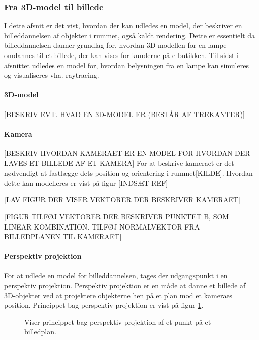 \subsubsection{Fra 3D-model til billede}
I dette afsnit er det vist, hvordan der kan udledes en model, der beskriver en billeddannelsen af objekter i rummet, også kaldt rendering. Dette er essentielt da billeddannelsen danner grundlag for, hvordan 3D-modellen for en lampe omdannes til et billede, der kan vises for kunderne på e-butikken. Til sidst i afsnittet udledes en model for, hvordan belysningen fra en lampe kan simuleres og visualiseres vha. raytracing. 

\paragraph{3D-model}
[BESKRIV EVT. HVAD EN 3D-MODEL ER (BESTÅR AF TREKANTER)]

\paragraph{Kamera}
[BESKRIV HVORDAN KAMERAET ER EN MODEL FOR HVORDAN DER LAVES ET BILLEDE AF ET KAMERA]
For at beskrive kameraet er det nødvendigt at fastlægge dets position og orientering i rummet[KILDE]. Hvordan dette kan modelleres er vist på figur [INDSÆT REF]

[LAV FIGUR DER VISER VEKTORER DER BESKRIVER KAMERAET]

[FIGUR TILFØJ VEKTORER DER BESKRIVER PUNKTET B, SOM LINEAR KOMBINATION. TILFØJ NORMALVEKTOR FRA BILLEDPLANEN TIL KAMERAET]

\paragraph{Perspektiv projektion}
For at udlede en model for billeddannelsen, tages der udgangspunkt i en perspektiv projektion. Perspektiv projektion er en måde at danne et billede af 3D-objekter ved at projektere objekterne hen på et plan mod et kameraes position\cite{fig:perspective_projection}. Princippet bag perspektiv projektion er vist på figur \ref{fig:perspektiv_projektion}.

\begin{figure}[H]
  \label{fig:perspektiv_projektion}
  \centering
  \caption{Viser princippet bag perspektiv projektion af et punkt på et billedplan.}
\end{figure}

